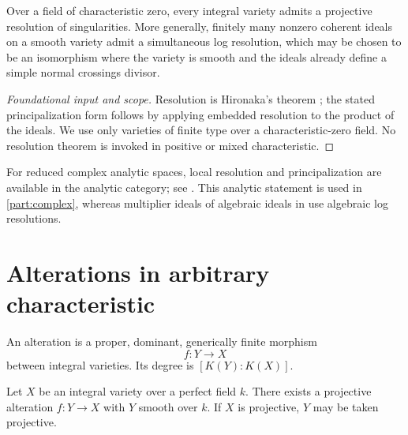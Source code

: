 \begin{theorem}\label{thm:appB-resolution}
Over a field of characteristic zero, every integral variety admits a
projective resolution of singularities.  More generally, finitely many
nonzero coherent ideals on a smooth variety admit a simultaneous log resolution,
which may be chosen to be an isomorphism where the variety is smooth and
the ideals already define a simple normal crossings divisor.
\end{theorem}

\begin{proof}[Foundational input and scope]
Resolution is Hironaka's theorem
\cite{Hironaka1964I,Hironaka1964II}; the stated principalization form
follows by applying
embedded resolution to the product of the ideals.  We use only varieties
of finite type over a characteristic-zero field.  No resolution theorem is
invoked in positive or mixed characteristic.
\end{proof}

\begin{remark}
\label{rem:appB-analytic-resolution}
For reduced complex analytic spaces, local resolution and principalization
are available in the analytic category; see \cite{Wlo09}.  This analytic
statement is used in \cref{part:complex}, whereas multiplier ideals of algebraic ideals
in  use algebraic log resolutions.
\end{remark}

\section{Alterations in arbitrary characteristic}
\label{sec:appB-alterations}

\begin{definition}[Alteration]
\label{def:appB-alteration}
An alteration is a proper, dominant, generically finite morphism
\[
 f:Y\longrightarrow X
\tag{B.6}\label{eq:appB-alteration}
\]
between integral varieties.  Its degree is \([K(Y):K(X)]\).
\end{definition}

\begin{theorem}\label{thm:appB-de-jong}
Let \(X\) be an integral variety over a perfect field \(k\).  There exists
a projective alteration \(f:Y\to X\) with \(Y\) smooth over \(k\).
If \(X\) is projective, \(Y\) may be taken projective.
\end{theorem}

